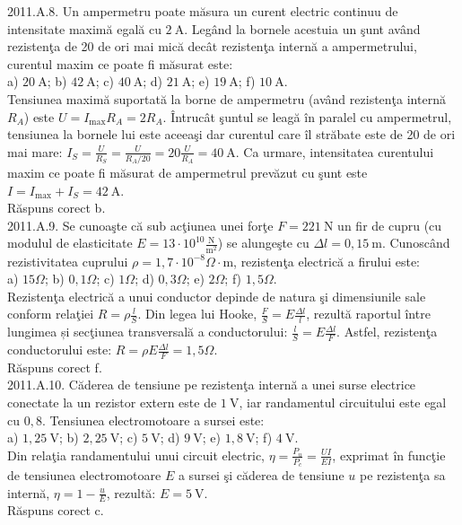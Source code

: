 2011.A.8. Un ampermetru poate măsura un curent electric continuu de intensitate maximă egală cu $2 \mathrm{~A}$. Legând la bornele acestuia un şunt având rezistenţa de 20 de ori mai mică decât rezistenţa internă a ampermetrului, curentul maxim ce poate fi măsurat este:\\ a) $20 \mathrm{~A}$; b) $42 \mathrm{~A}$; c) $40 \mathrm{~A}$; d) $21 \mathrm{~A}$; e) $19 \mathrm{~A}$; f) $10 \mathrm{~A}$.\\ Tensiunea maximă suportată la borne de ampermetru (având rezistenţa internă $R_{A}$) este $U=I_{\max} R_{A}=2 R_{A}$. Întrucât şuntul se leagă în paralel cu ampermetrul, tensiunea la bornele lui este aceeaşi dar curentul care îl străbate este de 20 de ori mai mare: $I_{S}=\frac{U}{R_{S}}=\frac{U}{R_{A} / 20}=20 \frac{U}{R_{A}}=40 \mathrm{~A}$. Ca urmare, intensitatea curentului maxim ce poate fi măsurat de ampermetrul prevăzut cu şunt este $I=I_{\text {max}}+I_{S}=42 \mathrm{~A}$.\\ Răspuns corect b.\\

2011.A.9. Se cunoaşte că sub acţiunea unei forţe $F=221 \mathrm{~N}$ un fir de cupru (cu modulul de elasticitate $E=13 \cdot 10^{10} \frac{\mathrm{N}}{\mathrm{m}^{2}}$) se alungeşte cu $\Delta l=0,15 \mathrm{~m}$. Cunoscând rezistivitatea cuprului $\rho=1,7 \cdot 10^{-8} \Omega \cdot \mathrm{m}$, rezistenţa electrică a firului este:\\ a) $15 \Omega$; b) $0,1 \Omega$; c) $1 \Omega$; d) $0,3 \Omega$; e) $2 \Omega$; f) $1,5 \Omega$.\\ Rezistenţa electrică a unui conductor depinde de natura şi dimensiunile sale conform relaţiei $R=\rho \frac{l}{S}$. Din legea lui Hooke, $\frac{F}{S}=E \frac{\Delta l}{l}$, rezultă raportul între lungimea și secţiunea transversală a conductorului: $\frac{l}{S}=E \frac{\Delta l}{F}$. Astfel, rezistenţa conductorului este: $R=\rho E \frac{\Delta l}{F}=1,5 \Omega$.\\ Răspuns corect f.\\

2011.A.10. Căderea de tensiune pe rezistenţa internă a unei surse electrice conectate la un rezistor extern este de $1 \mathrm{~V}$, iar randamentul circuitului este egal cu $0,8$. Tensiunea electromotoare a sursei este:\\ a) $1,25 \mathrm{~V}$; b) $2,25 \mathrm{~V}$; c) $5 \mathrm{~V}$; d) $9 \mathrm{~V}$; e) $1,8 \mathrm{~V}$; f) $4 \mathrm{~V}$.\\ Din relaţia randamentului unui circuit electric, $\eta=\frac{P_{u}}{P_{c}}=\frac{U I}{E I}$, exprimat în funcţie de tensiunea electromotoare $E$ a sursei şi căderea de tensiune $u$ pe rezistenţa sa internă, $\eta=1-\frac{u}{E}$, rezultă: $E=5 \mathrm{~V}$.\\ Răspuns corect c.\\

